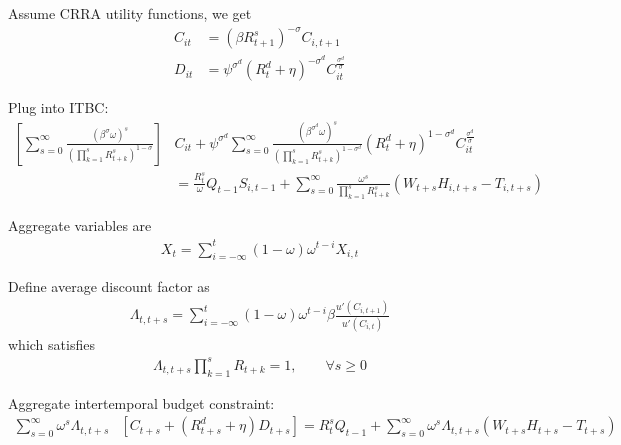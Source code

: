 \documentclass[11pt]{article}
\begin{document}
Assume CRRA utility functions, we get
\begin{align*}
	C_{it} &= (\beta R_{t+1}^s)^{-\sigma}C_{i,t+1} \\
	D_{it} &= \psi^{\sigma^d} \left(R_t^d + \eta \right)^{-\sigma^d} C_{it}^{\frac{\sigma^d}{\sigma}}
\end{align*}

Plug into ITBC:
\begin{align*}
	\left[\sum_{s=0}^{\infty}\frac{(\beta^{\sigma}\omega)^s}{(\prod_{k=1}^{s}R_{t+k}^s)^{1-\sigma}}\right]&C_{it}+\psi^{\sigma^d}  \sum_{s=0}^{\infty}\frac{(\beta^{\sigma^d}\omega)^s}{(\prod_{k=1}^{s}R_{t+k}^s)^{1-\sigma^d}}\left(R_t^d + \eta\right)^{1-\sigma^d}   C_{it}^{\frac{\sigma^d}{\sigma}} \\
	& = \frac{R_{t}^s}{\omega}Q_{t-1} S_{i,t-1} + \sum_{s=0}^{\infty}\frac{\omega^s}{\prod_{k=1}^{s}R_{t+k}^s}(W_{t+s}H_{i,t+s} - T_{i,t+s})
\end{align*}

Aggregate variables are 
\begin{align*}
	X_t = \sum_{i=-\infty}^{t}(1-\omega)\omega^{t-i}X_{i,t}
\end{align*}

Define average discount factor as
\begin{align*}
	\Lambda_{t,t+s} = \sum_{i=-\infty}^{t}(1-\omega)\omega^{t-i} \beta \frac{u'(C_{i,t+1})}{u'(C_{i,t})}
\end{align*}
which satisfies
\begin{align*}
	\Lambda_{t,t+s}\prod_{k=1}^{s}R_{t+k}  = 1,\qquad \forall s\ge 0
\end{align*}

Aggregate intertemporal budget constraint:
\begin{align*}
	\sum_{s=0}^{\infty}\omega^s \Lambda_{t,t+s} &\left[C_{t+s}+ (R_{t+s}^d + \eta) D_{t+s}  \right]  = R_{t}^s Q_{t-1} + \sum_{s=0}^{\infty}\omega^s \Lambda_{t,t+s}(W_{t+s}H_{t+s} - T_{t+s})
\end{align*}
\end{document}
